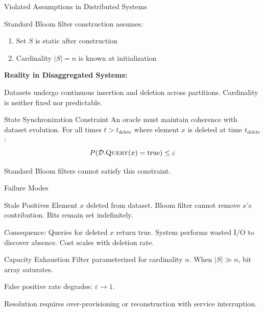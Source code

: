 \documentclass{beamer}
\begin{document}
\begin{frame}{Violated Assumptions in Distributed Systems}

    Standard Bloom filter construction assumes:
    \begin{enumerate}
        \item Set $S$ is static after construction
        \item Cardinality $|S| = n$ is known at initialization
    \end{enumerate}

    \vspace{0.8em}

    \textbf{Reality in Disaggregated Systems:}

    Datasets undergo continuous insertion and deletion across partitions. Cardinality is neither fixed nor predictable.

    \vspace{0.8em}

    \begin{block}{State Synchronization Constraint}
        An oracle must maintain coherence with dataset evolution. For all times $t > t_{\text{delete}}$ where element $x$ is deleted at time $t_{\text{delete}}$:
        $$P(\mathcal{D}.\textsc{Query}(x) = \text{true}) \leq \varepsilon$$
    \end{block}

    Standard Bloom filters cannot satisfy this constraint.

\end{frame}

\begin{frame}{Failure Modes}

    \begin{block}{Stale Positives}
        Element $x$ deleted from dataset. Bloom filter cannot remove $x$'s contribution. Bits remain set indefinitely.

        Consequence: Queries for deleted $x$ return true. System performs wasted I/O to discover absence. Cost scales with deletion rate.
    \end{block}

    \vspace{1em}

    \begin{block}{Capacity Exhaustion}
        Filter parameterized for cardinality $n$. When $|S| \gg n$, bit array saturates.

        False positive rate degrades: $\varepsilon \to 1$.

        Resolution requires over-provisioning or reconstruction with service interruption.
    \end{block}

\end{frame}
\end{document}
